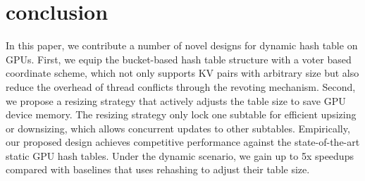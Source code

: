 \section{conclusion}\label{sec:con}
In this paper, we contribute a number of novel designs for dynamic hash table on GPUs. 
First, we equip the bucket-based hash table structure with a voter based coordinate scheme, 
which not only supports KV pairs with arbitrary size but also reduce the overhead of thread conflicts through the revoting mechanism. 
Second, we propose a resizing strategy that actively adjusts the table size to save GPU device memory. The resizing strategy only lock one subtable for efficient upsizing or downsizing, which allows concurrent updates to other subtables. Empirically, our proposed design achieves competitive performance against the state-of-the-art static GPU hash tables. Under the dynamic scenario, we gain up to 5x speedups compared with baselines that uses rehashing to adjust their table size. 

 